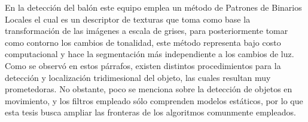 	En la detección del balón este equipo emplea un método de Patrones de Binarios Locales el cual es un descriptor de texturas que toma como base la transformación de las imágenes a escala de grises, para posteriormente tomar como contorno los cambios de tonalidad, este método representa bajo costo computacional y hace la segmentación más independiente a los cambios de luz. 
\\

	Como se observó en estos párrafos, existen distintos procedimientos para la detección y localización tridimesional del objeto, las cuales resultan muy prometedoras. No obstante, poco se menciona sobre la detección de objetos en movimiento, y los filtros empleado sólo comprenden modelos estáticos, por lo que esta tesis busca ampliar las fronteras de los algoritmos comunmente empleados. 	 